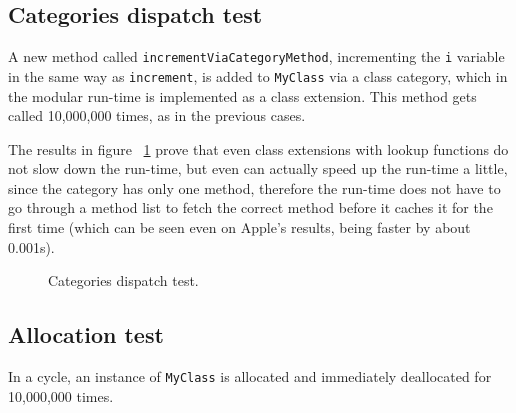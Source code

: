 \subsection{Categories dispatch test}

A new method called \verb=incrementViaCategoryMethod=, incrementing the \verb=i= variable in the same way as \verb=increment=, is added to \verb=MyClass= via a class category, which in the modular run-time is implemented as a class extension. This method gets called 10,000,000 times, as in the previous cases.

The results in figure ~\ref{fig:categories_dispatch_test} prove that even class extensions with lookup functions do not slow down the run-time, but even can actually speed up the run-time a little, since the category has only one method, therefore the run-time does not have to go through a method list to fetch the correct method before it caches it for the first time (which can be seen even on Apple's results, being faster by about 0.001s).

\begin{figure}[H]
  \centering{}
  \caption{Categories dispatch test.}
  \label{fig:categories_dispatch_test}
\end{figure}


\subsection{Allocation test}

In a cycle, an instance of \verb=MyClass= is allocated and immediately deallocated for 10,000,000 times.

